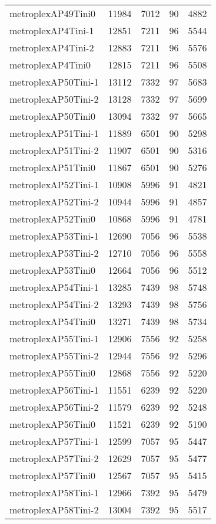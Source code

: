 \documentclass[../../../thesis.tex]{subfiles}
\begin{document}
\begin{longtable}{lrrrr}
metroplexAP49Tini0 & 11984 & 7012 & 90 & 4882 \\
metroplexAP4Tini-1 & 12851 & 7211 & 96 & 5544 \\
metroplexAP4Tini-2 & 12883 & 7211 & 96 & 5576 \\
metroplexAP4Tini0 & 12815 & 7211 & 96 & 5508 \\
metroplexAP50Tini-1 & 13112 & 7332 & 97 & 5683 \\
metroplexAP50Tini-2 & 13128 & 7332 & 97 & 5699 \\
metroplexAP50Tini0 & 13094 & 7332 & 97 & 5665 \\
metroplexAP51Tini-1 & 11889 & 6501 & 90 & 5298 \\
metroplexAP51Tini-2 & 11907 & 6501 & 90 & 5316 \\
metroplexAP51Tini0 & 11867 & 6501 & 90 & 5276 \\
metroplexAP52Tini-1 & 10908 & 5996 & 91 & 4821 \\
metroplexAP52Tini-2 & 10944 & 5996 & 91 & 4857 \\
metroplexAP52Tini0 & 10868 & 5996 & 91 & 4781 \\
metroplexAP53Tini-1 & 12690 & 7056 & 96 & 5538 \\
metroplexAP53Tini-2 & 12710 & 7056 & 96 & 5558 \\
metroplexAP53Tini0 & 12664 & 7056 & 96 & 5512 \\
metroplexAP54Tini-1 & 13285 & 7439 & 98 & 5748 \\
metroplexAP54Tini-2 & 13293 & 7439 & 98 & 5756 \\
metroplexAP54Tini0 & 13271 & 7439 & 98 & 5734 \\
metroplexAP55Tini-1 & 12906 & 7556 & 92 & 5258 \\
metroplexAP55Tini-2 & 12944 & 7556 & 92 & 5296 \\
metroplexAP55Tini0 & 12868 & 7556 & 92 & 5220 \\
metroplexAP56Tini-1 & 11551 & 6239 & 92 & 5220 \\
metroplexAP56Tini-2 & 11579 & 6239 & 92 & 5248 \\
metroplexAP56Tini0 & 11521 & 6239 & 92 & 5190 \\
metroplexAP57Tini-1 & 12599 & 7057 & 95 & 5447 \\
metroplexAP57Tini-2 & 12629 & 7057 & 95 & 5477 \\
metroplexAP57Tini0 & 12567 & 7057 & 95 & 5415 \\
metroplexAP58Tini-1 & 12966 & 7392 & 95 & 5479 \\
metroplexAP58Tini-2 & 13004 & 7392 & 95 & 5517 \\

\end{longtable}
\end{document}
